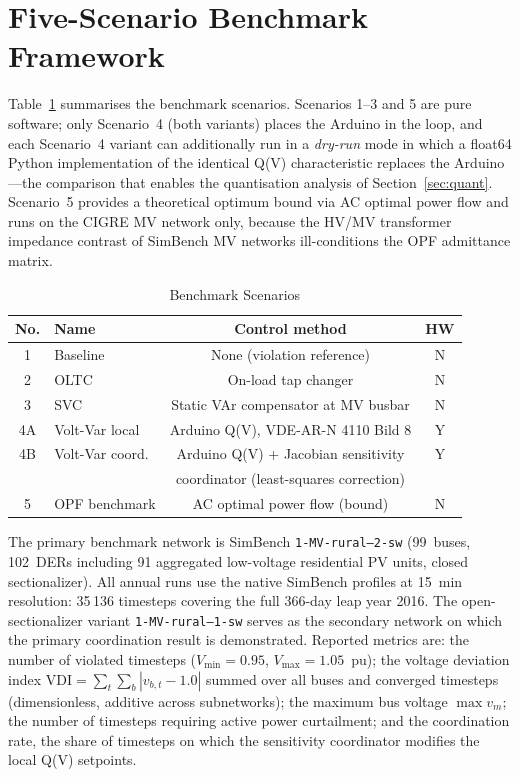 \documentclass[conference]{IEEEtran}
\begin{document}
\section{Five-Scenario Benchmark Framework}
\label{sec:benchmark}

Table~\ref{tab:scenarios} summarises the benchmark scenarios. Scenarios
1--3 and 5 are pure software; only Scenario~4 (both variants) places the
Arduino in the loop, and each Scenario~4 variant can additionally run in
a \emph{dry-run} mode in which a float64 Python implementation of the
identical Q(V) characteristic replaces the Arduino---the comparison that
enables the quantisation analysis of Section~\ref{sec:quant}. Scenario~5
provides a theoretical optimum bound via AC optimal power flow and runs
on the CIGRE MV network only, because the HV/MV transformer impedance
contrast of SimBench MV networks ill-conditions the OPF admittance
matrix.

\begin{table}[!t]
\caption{Benchmark Scenarios}
\label{tab:scenarios}
\centering
\begin{tabular}{@{}clcc@{}}
\toprule
No. & Name & Control method & HW \\
\midrule
1  & Baseline           & None (violation reference)             & N \\
2  & OLTC               & On-load tap changer                    & N \\
3  & SVC                & Static VAr compensator at MV busbar    & N \\
4A & Volt-Var local     & Arduino Q(V), VDE-AR-N 4110 Bild 8     & Y \\
4B & Volt-Var coord.    & Arduino Q(V) + Jacobian sensitivity    & Y \\
   &                    & coordinator (least-squares correction) &   \\
5  & OPF benchmark      & AC optimal power flow (bound)          & N \\
\bottomrule
\end{tabular}
\end{table}

The primary benchmark network is SimBench \texttt{1-MV-rural--2-sw}
(99~buses, 102~DERs including 91 aggregated low-voltage residential PV
units, closed sectionalizer). All annual runs use the native SimBench
profiles at \SI{15}{\minute} resolution: 35\,136 timesteps covering the
full 366-day leap year 2016. The open-sectionalizer variant
\texttt{1-MV-rural--1-sw} serves as the secondary network on which the
primary coordination result is demonstrated. Reported metrics are:
the number of violated timesteps ($V_\mathrm{min}{=}0.95$,
$V_\mathrm{max}{=}1.05$~pu); the voltage deviation index
$\mathrm{VDI}=\sum_{t}\sum_{b}\left|v_{b,t}-1.0\right|$ summed over all
buses and converged timesteps (dimensionless, additive across
subnetworks); the maximum bus voltage $\max v_m$; the number of timesteps
requiring active power curtailment; and the coordination rate, the share
of timesteps on which the sensitivity coordinator modifies the local
Q(V) setpoints.
\end{document}
